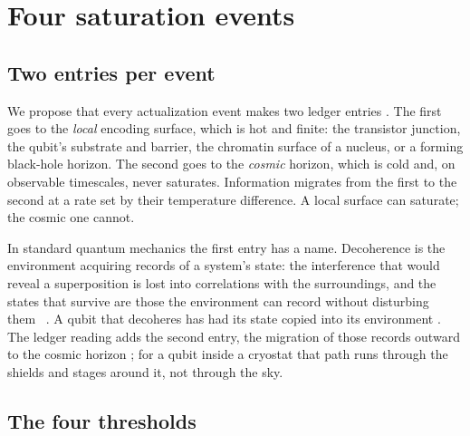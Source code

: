 \chapter{Four saturation events}\label{ch:saturation}

\section{Two entries per event}

We propose that every actualization event makes two ledger entries \conjecture. The first
goes to the \emph{local} encoding surface, which is hot and finite: the transistor junction,
the qubit's substrate and barrier, the chromatin surface of a nucleus, or a forming
black-hole horizon. The second goes to the \emph{cosmic} horizon, which is cold and, on
observable timescales, never saturates. Information migrates from the first to the second at
a rate set by their temperature difference. A local surface can saturate; the cosmic one
cannot.

In standard quantum mechanics the first entry has a name. Decoherence is the environment acquiring records of a system's state: the
interference that would reveal a superposition is lost into correlations with the surroundings, and the states that survive are those
the environment can record without disturbing them~\cite{Zurek2003} \derived. A qubit that decoheres has had its state copied into its
environment \derived. The ledger reading adds the second entry, the migration of those records outward to the cosmic horizon \conjecture; for a
qubit inside a cryostat that path runs through the shields and stages around it, not through the sky. \interp

\section{The four thresholds}

